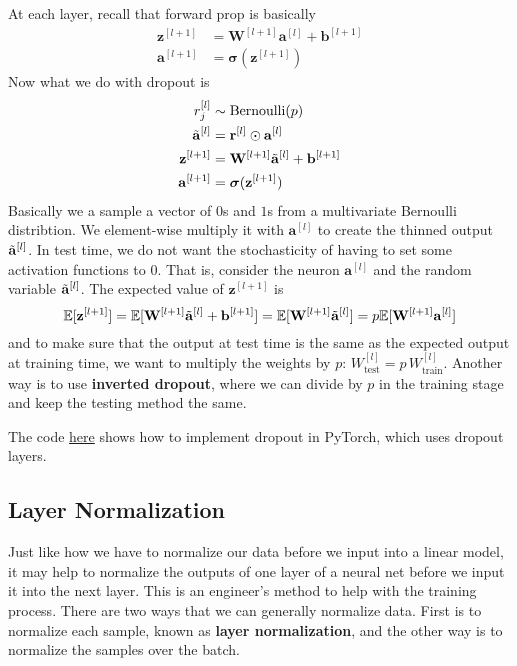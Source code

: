   At each layer, recall that forward prop is basically 
  \begin{align*}
      \mathbf{z}^{[l+1]} & = \mathbf{W}^{[l+1]} \mathbf{a}^{[l]} + \mathbf{b}^{[l+1]} \\
      \mathbf{a}^{[l+1]} & = \boldsymbol{\sigma} (\mathbf{z}^{[l+1]}) 
  \end{align*}
  Now what we do with dropout is 
  \begin{align*}
      r_j^{[l]} & \sim \mathrm{Bernoulli}(p) \\
      \Tilde{\mathbf{a}}^{[l]} & = \mathbf{r}^{[l]} \odot \mathbf{a}^{[l]} \\
      \mathbf{z}^{[l+1]} & = \mathbf{W}^{[l+1]} \Tilde{\mathbf{a}}^{[l]} + \mathbf{b}^{[l+1]} \\
      \mathbf{a}^{[l+1]} & = \boldsymbol{\sigma} (\mathbf{z}^{[l+1]}) 
  \end{align*}
  Basically we a sample a vector of $0$s and $1$s from a multivariate Bernoulli distribtion. We element-wise multiply it with $\mathbf{a}^{[l]}$ to create the thinned output $\Tilde{\mathbf{a}}^{[l]}$. In test time, we do not want the stochasticity of having to set some activation functions to $0$. That is, consider the neuron $\mathbf{a}^{[l]}$ and the random variable $\Tilde{\mathbf{a}}^{[l]}$. The expected value of $\mathbf{z}^{[l+1]}$ is 
  \[\mathbb{E}[\mathbf{z}^{[l+1]}] = \mathbb{E}[ \mathbf{W}^{[l+1]} \Tilde{\mathbf{a}}^{[l]} + \mathbf{b}^{[l+1]}] = \mathbb{E}[ \mathbf{W}^{[l+1]} \Tilde{\mathbf{a}}^{[l]}] = p \mathbb{E}[\mathbf{W}^{[l+1]} \mathbf{a}^{[l]}] \]
  and to make sure that the output at test time is the same as the expected output at training time, we want to multiply the weights by $p$: $W^{[l]}_{\text{test}} = p \, W^{[l]}_{\text{train}}$. Another way is to use \textbf{inverted dropout}, where we can divide by $p$ in the training stage and keep the testing method the same. 

  \begin{code} 
    The code \href{code/dropout.ipynb}{here} shows how to implement dropout in PyTorch, which uses dropout layers. 
  \end{code}

\subsection{Layer Normalization} 

  Just like how we have to normalize our data before we input into a linear model, it may help to normalize the outputs of one layer of a neural net before we input it into the next layer. This is an engineer's method to help with the training process. There are two ways that we can generally normalize data. First is to normalize each sample, known as \textbf{layer normalization}, and the other way is to normalize the samples over the batch. 

